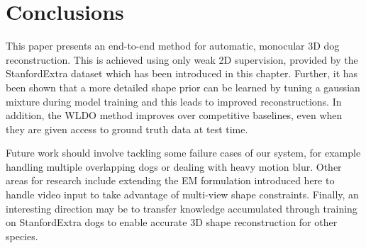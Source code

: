 
\section{Conclusions}
This paper presents an end-to-end method for automatic, monocular 3D dog reconstruction. This is achieved using only weak 2D supervision, provided by the StanfordExtra dataset which has been introduced in this chapter. Further, it has been shown that a more detailed shape prior can be learned by tuning a gaussian mixture during model training and this leads to improved reconstructions. In addition, the WLDO method improves over competitive baselines, even when they are given access to ground truth data at test time.

Future work should involve tackling some failure cases of our system, for example handling multiple overlapping dogs or dealing with heavy motion blur. Other areas for research include extending the EM formulation introduced here to handle video input to take advantage of multi-view shape constraints. Finally, an interesting direction may be to transfer knowledge accumulated through training on StanfordExtra dogs to enable accurate 3D shape reconstruction for other species.

% 


